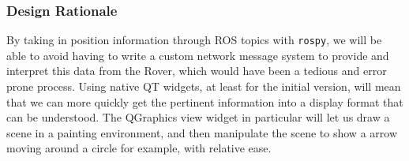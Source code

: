 \subsubsection{Design Rationale}
By taking in position information through ROS topics with \texttt{rospy}, we will be able to avoid having to write a custom network message system to provide and interpret this data from the Rover, which would have been a tedious and error prone process.
Using native QT widgets, at least for the initial version, will mean that we can more quickly get the pertinent information into a display format that can be understood. 
The QGraphics view widget in particular will let us draw a scene in a painting environment, and then manipulate the scene to show a arrow moving around a circle for example, with relative ease.

